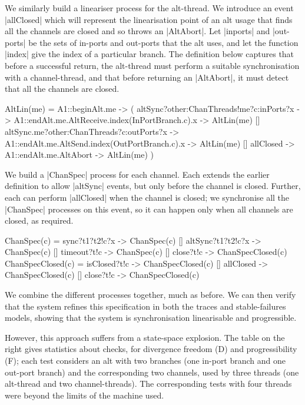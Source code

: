 We similarly build a lineariser process for the alt-thread.  We introduce an
event |allClosed| which will represent the linearisation point of an alt usage
that finds all the channels are closed and so throws an |AltAbort|.  
%
Let |inports| and |out-ports| be the sets of in-ports and out-ports that the alt
uses, and let the function |index| give the index of a particular branch.  The
definition below captures that before a successful return, the alt-thread must
perform a suitable synchronisation with a channel-thread, and that before
returning an |AltAbort|, it must detect that all the channels are closed. 
%
\begin{cspm}
AltLin(me) = 
  A1::beginAlt.me -> (
    altSync?other:ChanThreads!me?c:inPorts?x -> 
       A1::endAlt.me.AltReceive.index(InPortBranch.c).x -> AltLin(me)
    [] altSync.me?other:ChanThreads?c:outPorts?x -> 
          A1::endAlt.me.AltSend.index(OutPortBranch.c).x -> AltLin(me)
    [] allClosed -> A1::endAlt.me.AltAbort -> AltLin(me)
  )
\end{cspm}

We build a |ChanSpec| process for each channel.  Each extends the earlier
definition to allow |altSync| events, but only before the channel is closed.
Further, each can perform |allClosed| when the channel is closed; we
synchronise all the |ChanSpec| processes on this event, so it can happen only
when all channels are closed, as required.
%
\begin{cspm}
ChanSpec(c) = 
  sync?t1?t2!c?x -> ChanSpec(c) [] altSync?t1?t2!c?x -> ChanSpec(c) 
  [] timeout?t!c -> ChanSpec(c)   [] close?t!c -> ChanSpecClosed(c)
ChanSpecClosed(c) =
  isClosed?t!c -> ChanSpecClosed(c) [] allClosed -> ChanSpecClosed(c) [] close?t!c -> ChanSpecClosed(c)
\end{cspm}

We combine the different processes together, much as before.  We can then
verify that the system refines this specification in both the traces and
stable-failures models, showing that the system is synchronisation
linearisable and progressible.

\begin{window}
%
However, this approach suffers from a state-space explosion.  The table on the
right gives statistics about checks, for divergence freedom (D) and
progressibility (F); each test considers an alt with two branches (one in-port
branch and one out-port branch) and the corresponding two channels, used by
three threads (one alt-thread and two channel-threads).  The corresponding
tests with four threads were beyond the limits of the machine used. 
\end{window}
